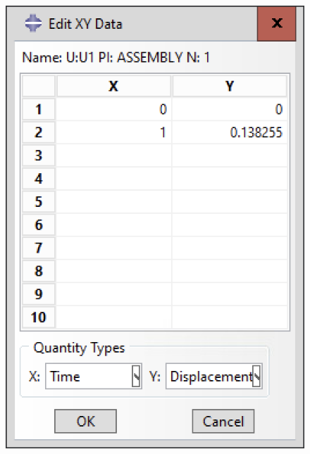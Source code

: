 \begin{figure}[H]
{        \includegraphics[scale=0.4]{Images/ab1/a31.png}
    }
    \quad
    \subfloat{
}
\end{figure}
